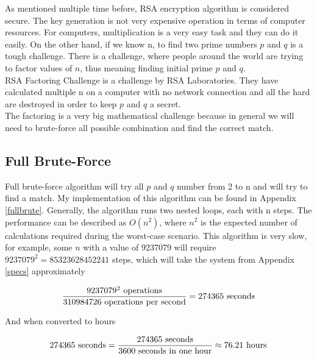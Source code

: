 \documentclass[a4paper, 12pt]{article}
\begin{document}
As mentioned multiple time before, RSA encryption algorithm is considered secure. The key
generation is not very expensive operation in terms of computer resources. For computers,
multiplication is a very easy task and they can do it easily. On the other hand, if we know n, to
find two prime numbers $p$ and $q$ is a tough challenge. There is a challenge, where people around
the world are trying to factor values of $n$, thus meaning finding initial prime $p$ and $q$.\cite{rsa}\\

RSA Factoring Challenge is a challenge by RSA Laboratories. They have calculated multiple n on
a computer with no network connection and all the hard are destroyed in order to keep $p$ and $q$ a
secret.\\

The factoring is a very big mathematical challenge because in general we will need to brute-force
all possible combination and find the correct match.\\

\subsection{Full Brute-Force}
\label{bsec:full}

Full brute-force algorithm will try all $p$ and $q$ number from 2 to n and will try to find a match. My
implementation of this algorithm can be found in Appendix \ref{fullbrute}. Generally, the algorithm runs two
nested loops, each with n steps. The performance can be described as $O(n^2)$, where $n^2$ is the
expected number of calculations required during the worst-case scenario.
This algorithm is very slow, for example, some $n$ with a value of
9237079 will require $9237079^2 = 85323628452241$ steps, which will take the system from
Appendix \ref{specs} approximately

\begin{equation*}
  \frac{9237079^2 \text{ operations}}{ 310984726 \text{ operations per second}} = 274365 \text{ seconds}\\
  \end{equation*}

And when converted to hours

\begin{equation*}
  274365 \text{ seconds}=\frac{274365 \text{ seconds}}{3600  \text{ seconds in one hour}} \approx 76.21 \text{ hours}\\
  \end{equation*}
\end{document}
